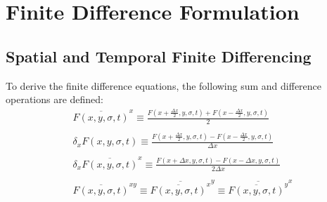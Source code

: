 \documentclass[oribibl]{llncs}
\begin{document}
\section{Finite Difference Formulation}

\subsection{Spatial and Temporal Finite Differencing}

To derive the finite difference equations, the following sum and difference operations are defined:
\begin{eqnarray}
\overline{F(x,y,\sigma,t)}^x \equiv \frac{F(x+\frac{\Delta x}{2}, y, \sigma, t) + F(x-\frac{\Delta x}{2}, y, \sigma, t)}{2} \\
\nonumber \\
\delta_x {F(x,y,\sigma,t)} \equiv \frac{F(x+\frac{\Delta x}{2}, y, \sigma, t) - F(x-\frac{\Delta x}{2}, y, \sigma, t)}{\Delta x} \\
\nonumber \\
\delta_x \overline{F(x,y,\sigma,t)}^x \equiv \frac{F(x+\Delta x, y, \sigma, t) - F(x-\Delta x, y, \sigma, t)}{2\Delta x} \\
\nonumber \\
\overline{F(x,y,\sigma,t)}^{xy} \equiv \overline{\overline{F(x,y,\sigma,t)}^x}^y \equiv \overline{\overline{F(x,y,\sigma,t)}^y}^x 
\end{eqnarray}
\end{document}
